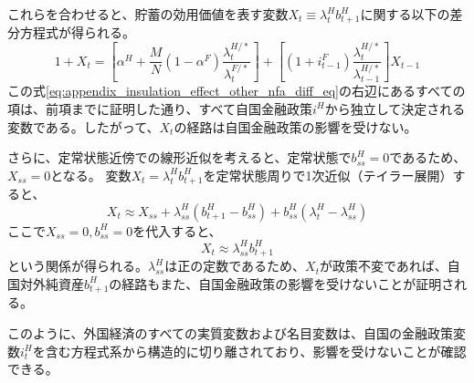 これらを合わせると、貯蓄の効用価値を表す変数\(X_t\equiv\lambda_t^Hb_{t+1}^H\)に関する以下の差分方程式が得られる。
\begin{equation}
    1+X_t=\left[\alpha^H+\frac{M}{N}(1-\alpha^F)\frac{\lambda_t^{H/*}}{\lambda_t^{F/*}}\right]+\left[(1+i_{t-1}^F)\frac{\lambda_t^{H/*}}{\lambda_{t-1}^{H/*}}\right]X_{t-1}
    \label{eq:appendix_insulation_effect_other_nfa_diff_eq}
\end{equation}
この式\eqref{eq:appendix_insulation_effect_other_nfa_diff_eq}の右辺にあるすべての項は、前項までに証明した通り、すべて自国金融政策\(i^H\)から独立して決定される変数である。したがって、\(X_t\)の経路は自国金融政策の影響を受けない。

さらに、定常状態近傍での線形近似を考えると、定常状態で\(b_{ss}^H=0\)であるため、\(X_{ss}=0\)となる。
変数\(X_t=\lambda_t^Hb_{t+1}^H\)を定常状態周りで1次近似（テイラー展開）すると、
\begin{equation}
X_t\approx X_{ss}+\lambda_{ss}^H(b_{t+1}^H-b_{ss}^H)+b_{ss}^H(\lambda_t^H-\lambda_{ss}^H)
\label{eq:appendix_insulation_effect_other_nfa_approx_step}
\end{equation}
ここで\(X_{ss}=0,b_{ss}^H=0\)を代入すると、
\begin{equation}
X_t\approx\lambda_{ss}^Hb_{t+1}^H
\label{eq:appendix_insulation_effect_other_nfa_linear_approx}
\end{equation}
という関係が得られる。\(\lambda_{ss}^H\)は正の定数であるため、\(X_t\)が政策不変であれば、自国対外純資産\(b_{t+1}^H\)の経路もまた、自国金融政策の影響を受けないことが証明される。

このように、外国経済のすべての実質変数および名目変数は、自国の金融政策変数\(i_t^H\)を含む方程式系から構造的に切り離されており、影響を受けないことが確認できる。